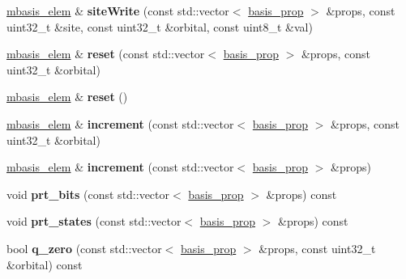 \begin{DoxyCompactItemize}
\hyperlink{classqbasis_1_1mbasis__elem}{mbasis\+\_\+elem} \& {\bfseries site\+Write} (const std\+::vector$<$ \hyperlink{classqbasis_1_1basis__prop}{basis\+\_\+prop} $>$ \&props, const uint32\+\_\+t \&site, const uint32\+\_\+t \&orbital, const uint8\+\_\+t \&val)
\item 
\mbox{\label{classqbasis_1_1mbasis__elem_a648ab0ec63d40cd31d350a2973de8e06}} 
\hyperlink{classqbasis_1_1mbasis__elem}{mbasis\+\_\+elem} \& {\bfseries reset} (const std\+::vector$<$ \hyperlink{classqbasis_1_1basis__prop}{basis\+\_\+prop} $>$ \&props, const uint32\+\_\+t \&orbital)
\item 
\mbox{\label{classqbasis_1_1mbasis__elem_a5bd8679e68b422efdf61925b8f58a1af}} 
\hyperlink{classqbasis_1_1mbasis__elem}{mbasis\+\_\+elem} \& {\bfseries reset} ()
\item 
\mbox{\label{classqbasis_1_1mbasis__elem_a19b3ecc03b45705e608881677d0f8eaf}} 
\hyperlink{classqbasis_1_1mbasis__elem}{mbasis\+\_\+elem} \& {\bfseries increment} (const std\+::vector$<$ \hyperlink{classqbasis_1_1basis__prop}{basis\+\_\+prop} $>$ \&props, const uint32\+\_\+t \&orbital)
\item 
\mbox{\label{classqbasis_1_1mbasis__elem_aa228c0e8f294055e682529c19de65c32}} 
\hyperlink{classqbasis_1_1mbasis__elem}{mbasis\+\_\+elem} \& {\bfseries increment} (const std\+::vector$<$ \hyperlink{classqbasis_1_1basis__prop}{basis\+\_\+prop} $>$ \&props)
\item 
\mbox{\label{classqbasis_1_1mbasis__elem_a6d838ef0961a9639f1a3c76a819ec2d0}} 
void {\bfseries prt\+\_\+bits} (const std\+::vector$<$ \hyperlink{classqbasis_1_1basis__prop}{basis\+\_\+prop} $>$ \&props) const
\item 
\mbox{\label{classqbasis_1_1mbasis__elem_a259a1bcc3c1b9e3a4ba240b272efcd39}} 
void {\bfseries prt\+\_\+states} (const std\+::vector$<$ \hyperlink{classqbasis_1_1basis__prop}{basis\+\_\+prop} $>$ \&props) const
\item 
\mbox{\label{classqbasis_1_1mbasis__elem_a3a8119e7fe0bb56bb38357856788dcdb}} 
bool {\bfseries q\+\_\+zero} (const std\+::vector$<$ \hyperlink{classqbasis_1_1basis__prop}{basis\+\_\+prop} $>$ \&props, const uint32\+\_\+t \&orbital) const

\end{DoxyCompactItemize}
